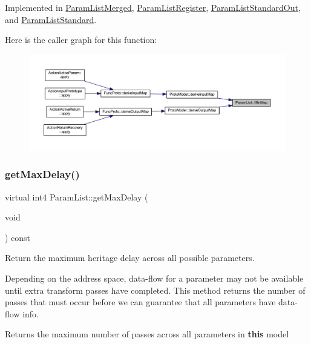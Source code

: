 Implemented in \mbox{\hyperlink{class_param_list_merged_aa4252b6768505e059edfe83ebdbf2065}{Param\+List\+Merged}}, \mbox{\hyperlink{class_param_list_register_a35bf1a7b1033500cb3657608c27d4786}{Param\+List\+Register}}, \mbox{\hyperlink{class_param_list_standard_out_aab2d6055785c4e98b3a8c4e1b70f86be}{Param\+List\+Standard\+Out}}, and \mbox{\hyperlink{class_param_list_standard_a7fa7043f5c6bba995e2ea716ca16ccaf}{Param\+List\+Standard}}.

Here is the caller graph for this function\+:
\nopagebreak
\begin{figure}[H]
\begin{center}
\leavevmode
\includegraphics[width=350pt]{class_param_list_aaf2680343e933767d7ffd38e22e84011_icgraph}
\end{center}
\end{figure}
\mbox{\label{class_param_list_af3d5640d0912fca118219d8213ed3a28}} 
\subsubsection{\texorpdfstring{getMaxDelay()}{getMaxDelay()}}
{\footnotesize\ttfamily virtual int4 Param\+List\+::get\+Max\+Delay (\begin{DoxyParamCaption}\item[{void}]{ }\end{DoxyParamCaption}) const\hspace{0.3cm}{\ttfamily [pure virtual]}}



Return the maximum heritage delay across all possible parameters. 

Depending on the address space, data-\/flow for a parameter may not be available until extra transform passes have completed. This method returns the number of passes that must occur before we can guarantee that all parameters have data-\/flow info. \begin{DoxyReturn}{Returns}
the maximum number of passes across all parameters in {\bfseries{this}} model 
\end{DoxyReturn}


